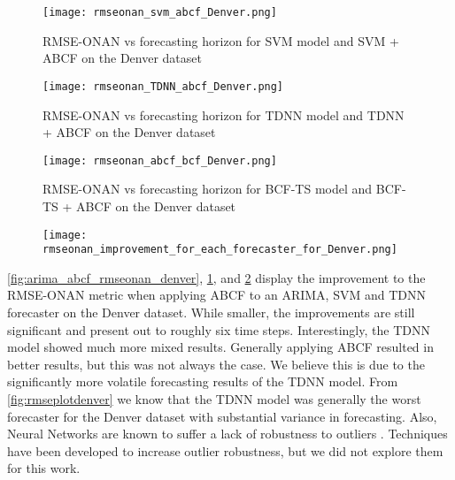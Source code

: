 \begin{figure}[p]
	\begin{center}
		\texttt{[image: rmseonan\_svm\_abcf\_Denver.png]}
	\end{center}
	\caption{RMSE-ONAN vs forecasting horizon for SVM model and SVM + ABCF on the Denver dataset}
	\label{fig:svm_abcf_rmseonan_denver}
\end{figure}

\begin{figure}[p]
	\begin{center}
		\texttt{[image: rmseonan\_TDNN\_abcf\_Denver.png]}
	\end{center}
	\caption{RMSE-ONAN vs forecasting horizon for TDNN model and TDNN + ABCF on the Denver dataset}
	\label{fig:tdnn_abcf_rmseonan_denver}
\end{figure}

\begin{figure}[p]
	\begin{center}
		\texttt{[image: rmseonan\_abcf\_bcf\_Denver.png]}
	\end{center}
	\caption{RMSE-ONAN vs forecasting horizon for BCF-TS model and BCF-TS + ABCF on the Denver dataset}
	\label{fig:bcf_abcf_rmseonan_denver}
\end{figure}

\begin{figure}[p]
	\begin{center}
		\texttt{[image: rmseonan\_improvement\_for\_each\_forecaster\_for\_Denver.png]}
	\end{center}
	\caption{}
	\label{fig:rmseonan_improve_denver}
\end{figure}

\ref{fig:arima_abcf_rmseonan_denver}, \ref{fig:svm_abcf_rmseonan_denver}, and \ref{fig:tdnn_abcf_rmseonan_denver} display the improvement to the RMSE-ONAN metric when applying ABCF to an ARIMA, SVM and TDNN forecaster on the Denver dataset.  While smaller, the improvements are still significant and present out to roughly six time steps.  Interestingly, the TDNN model showed much more mixed results.  Generally applying ABCF resulted in better results, but this was not always the case.  We believe this is due to the significantly more volatile forecasting results of the TDNN model.  From \ref{fig:rmseplotdenver} we know that the TDNN model was generally the worst forecaster for the Denver dataset with substantial variance in forecasting.  Also, Neural Networks are known to suffer a lack of robustness to outliers \cite{connor1994}.  Techniques have been developed to increase outlier robustness, but we did not explore them for this work.

